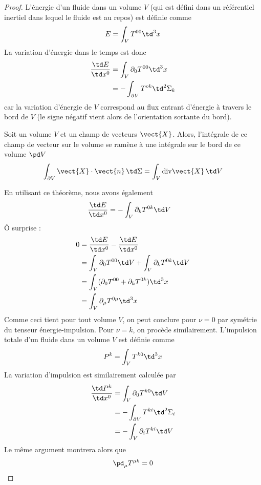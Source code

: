 \begin{proof}
L'énergie d'un fluide dans un volume $V$ (qui est défini dans un référentiel inertiel dans lequel le fluide est au repos) est définie comme
    \begin{equation}
        E = \int_{V} T^{00} \td^3 x
    \end{equation}
La variation d'énergie dans le temps est donc
\begin{align}
    \frac{\td E}{\td x^{0}} &= \int_{V}\partial_{0}T^{00} \td^3 x \\
    &= - \int_{\partial V} T^{ok}\td ^{2}\Sigma_{k}
\end{align}
car la variation d'énergie de $V$ correspond au flux entrant d'énergie à travers le bord de $V$ (le signe négatif vient alors de l'orientation sortante du bord).
\begin{theoremframe}
    \begin{lemme}
        Soit un volume $V$ et un champ de vecteurs $\vect{X}$. Alors, l'intégrale de ce champ de vecteur sur le volume se ramène à une intégrale sur le bord de ce volume $\pd V$
        \begin{equation}
            \int_{\partial V} \vect{X} \cdot \vect{n} \, \td \Sigma = \int_{V} \mathrm{div}\vect{X} \,\td V
        \end{equation}
    \end{lemme}
\end{theoremframe}
En utilisant ce théorème, nous avons également
\begin{align}
    \frac{\td E}{\td x^{0}} &=-\int_{V}\partial_{k}T^{0k} \td V
\end{align}
Ô surprise :
\begin{align}
    0 &= \frac{\td E}{\td x^{0}} -\frac{\td E}{\td x^{0}} \\
      &= \int_{V}\partial_{0}T^{00} \td V + \int_{V}\partial_{k}T^{0k} \td V\\
      &= \int_{V}(\partial_{0}T^{00} +\partial_{k}T^{0k} )\td ^{3}x\\
      &= \int_{V} \partial_{\mu}T^{0\mu} \td^3 x
\end{align}
Comme ceci tient pour tout volume $V$, on peut conclure pour $\nu = 0$ par symétrie du tenseur énergie-impulsion. Pour $\nu = k$, on procède similairement. L'impulsion totale d'un fluide dans un volume $V$ est définie comme
    \begin{equation}
        P^{k} = \int_{V} T^{k0}\td ^3x
    \end{equation}
La variation d'impulsion est similairement calculée par
\begin{align}
    \frac{\td P^k}{\td x^{0}} &=\int_{V}\partial_{0}T^{k0} \td V\\
    &=- \int_{\partial V}T^{ki} \td ^2\Sigma_{i}\\
    &= - \int_{V}\partial_{i}T^{ki} \td V\\
\end{align}
Le même argument montrera alors que
\begin{equation}
    \pd_\mu T^{\mu k} = 0
\end{equation}
\end{proof}
